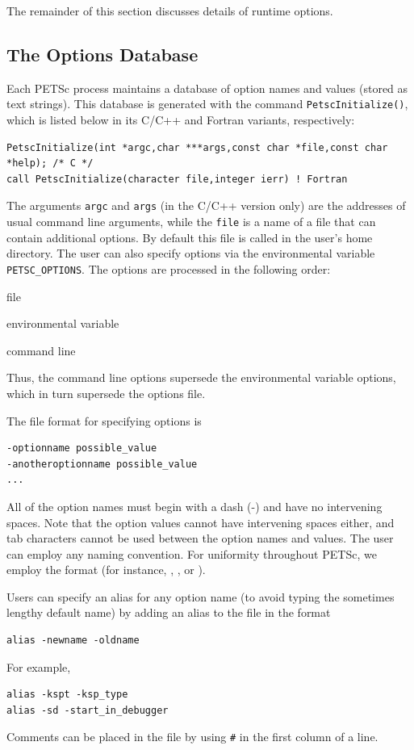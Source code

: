 {{The remainder of this section discusses details of runtime options.

\subsection{The Options Database}

Each PETSc process maintains a database of option names and values
(stored as text strings). This database is generated with the command
\lstinline{PetscInitialize()}, which is listed below in its C/C++ and
Fortran variants, respectively:
\begin{lstlisting}
PetscInitialize(int *argc,char ***args,const char *file,const char *help); /* C */
call PetscInitialize(character file,integer ierr) ! Fortran
\end{lstlisting}
The arguments \lstinline{argc} and \lstinline{args} (in the C/C++ version only) are
the addresses of usual command line arguments, while the \lstinline{file} is a name of
a file that can contain additional options.
By default this file is called   in the
user's home directory.  The user can also specify options via the
environmental variable \lstinline{PETSC_OPTIONS}.  
The options are processed in the following order:
\begin{tightenumerate}
\item file
\item environmental variable
\item command line
\end{tightenumerate}
Thus, the command line options supersede the environmental variable
options, which in turn supersede the options file.

The file format for specifying options is
\begin{lstlisting}
-optionname possible_value
-anotheroptionname possible_value
...
\end{lstlisting}
All of the option names must begin with a dash (-) and have no intervening
spaces.  Note that the option values cannot
have intervening spaces either, and tab characters cannot be used
between the option names and values.
The user can employ any naming convention.  For uniformity throughout
PETSc, we employ the format  (for instance,
, , or ).

Users can specify an alias for any option name (to avoid typing the
sometimes lengthy default name) by adding an alias to the
  file in the format
 
\begin{lstlisting}
alias -newname -oldname
\end{lstlisting}
For example,
\begin{lstlisting}
alias -kspt -ksp_type
alias -sd -start_in_debugger
\end{lstlisting}
Comments can be placed in the  file by using \lstinline{#} in the first column of a line.

}}
